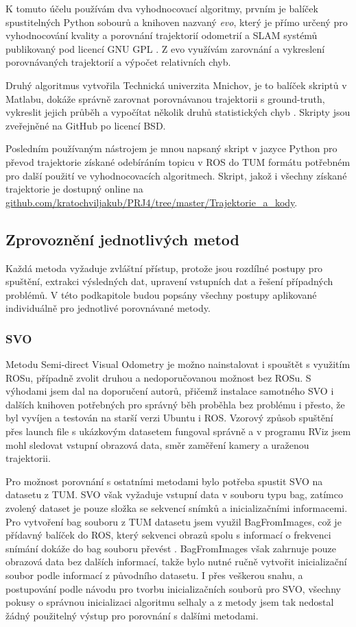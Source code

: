 \documentclass[12pt,a4paper]{article}
\begin{document}
K tomuto účelu používám dva vyhodnocovací algoritmy, prvním je balíček spustitelných Python sobourů a knihoven nazvaný \textit{evo}, který je přímo určený pro vyhodnocování kvality a porovnání trajektorií odometrií a SLAM systémů publikovaný pod licencí GNU GPL \cite{evo}. Z evo využívám zarovnání a vykreslení porovnávaných trajektorií a výpočet relativních chyb.

Druhý algoritmus vytvořila Technická univerzita Mnichov, je to balíček skriptů v Matlabu, dokáže správně zarovnat porovnávanou trajektorii s ground-truth, vykreslit jejich průběh a vypočítat několik druhů statistických chyb \cite{tum_evo}. Skripty jsou zveřejněné na GitHub po licencí BSD.

Posledním používaným nástrojem je mnou napsaný skript v jazyce Python pro převod trajektorie získané odebíráním topicu v ROS do TUM formátu potřebném pro další použití ve vyhodnocovacích algoritmech. Skript, jakož i všechny získané trajektorie je dostupný online na \url{github.com/kratochviljakub/PRJ4/tree/master/Trajektorie_a_kody}.

\subsection{Zprovoznění jednotlivých metod}
Každá metoda vyžaduje zvláštní přístup, protože jsou rozdílné postupy pro spuštění, extrakci výsledných dat, upravení vstupních dat a řešení případných problémů. V této podkapitole budou popsány všechny postupy aplikované individuálně pro jednotlivé porovnávané metody.

\subsubsection{SVO}
Metodu Semi-direct Visual Odometry je možno nainstalovat i spouštět s využitím ROSu, případně zvolit druhou a nedoporučovanou možnost bez ROSu. S výhodami jsem dal na doporučení autorů, přičemž instalace samotného SVO i dalších knihoven potřebných pro správný běh proběhla bez problému i přesto, že byl vyvíjen a testován na starší verzi Ubuntu i ROS. Vzorový způsob spuštění přes launch file s ukázkovým datasetem fungoval správně a v programu RViz jsem mohl sledovat vstupní obrazová data, směr zaměření kamery a uraženou trajektorii. 

Pro možnost porovnání s ostatními metodami bylo potřeba spustit SVO na datasetu z TUM. SVO však vyžaduje vstupní data v souboru typu bag, zatímco zvolený dataset je pouze složka se sekvencí snímků a inicializačními informacemi. Pro vytvoření bag souboru z TUM datasetu jsem využil BagFromImages, což je přídavný balíček do ROS, který sekvenci obrazů spolu s informací o frekvenci snímání dokáže do bag souboru převést \cite{BagFromImages}. BagFromImages však zahrnuje pouze obrazová data bez dalších informací, takže bylo nutné ručně vytvořit inicializační soubor podle informací z původního datasetu. I přes veškerou snahu, a postupování podle návodu pro tvorbu inicializačních souborů pro SVO, všechny pokusy o správnou inicializaci algoritmu selhaly a z metody jsem tak nedostal žádný použitelný výstup pro porovnání s dalšími metodami.
\end{document}
